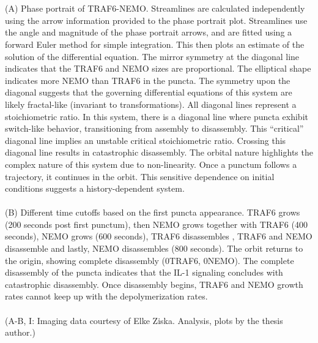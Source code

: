 \begin{centering}
{\\
\\
(A) Phase portrait of TRAF6-NEMO. Streamlines are calculated independently using the arrow information provided to the phase portrait plot. Streamlines use the angle and magnitude of the phase portrait arrows, and are fitted using a forward Euler method for simple integration. This then plots an estimate of the solution of the differential equation. The mirror symmetry at the diagonal line indicates that the TRAF6 and NEMO sizes are proportional. The elliptical shape indicates more NEMO than TRAF6 in the puncta. The symmetry upon the diagonal suggests that the governing differential equations of this system are likely fractal-like (invariant to transformations). All diagonal lines represent a stoichiometric ratio. In this system, there is a diagonal line where puncta exhibit switch-like behavior, transitioning from assembly to disassembly. This “critical” diagonal line implies an unstable critical stoichiometric ratio. Crossing this diagonal line results in catastrophic disassembly. The orbital nature highlights the complex nature of this system due to non-linearity. Once a punctum follows a trajectory, it continues in the orbit. This sensitive dependence on initial conditions suggests a history-dependent system.
\\
\\
(B) Different time cutoffs based on the first puncta appearance. TRAF6 grows (200 seconds post first punctum), then NEMO grows together with TRAF6 (400 seconds), NEMO grows (600 seconds), TRAF6 disassembles , TRAF6 and NEMO disassemble and lastly, NEMO disassembles (800 seconds). The orbit returns to the origin, showing complete disassembly (0\times TRAF6, 0\times NEMO). The complete disassembly of the puncta indicates that the IL-1 signaling concludes with catastrophic disassembly. Once disassembly begins, TRAF6 and NEMO growth rates cannot keep up with the depolymerization rates. 
\\
\\
(A-B, I: Imaging data courtesy of Elke Ziska. Analysis, plots by the thesis author.)}
\label{p2:6b}
\end{centering}

